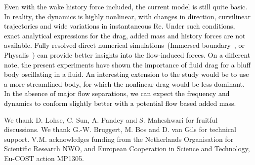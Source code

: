 \documentclass{jfm}
\begin{document}
\textcolor{black}{Even with the wake history force included, the current model is still quite basic. In reality, the dynamics is highly nonlinear, with changes in direction, curvilinear trajectories and wide variations in instantaneous Re. Under such conditions, exact analytical expressions for the drag, added mass and history forces are not available.
Fully resolved direct numerical simulations~(Immersed boundary~\citep{mittal2005immersed}, or Physalis~\citep{naso2010interaction}) can provide better insights into the flow-induced forces. 
On a different note, the present experiments have shown the importance of fluid drag for a bluff body oscillating in a fluid. An interesting extension to the study would be to use a more streamlined body, for which the nonlinear drag would be less dominant. In the absence of major flow separations, we can expect the frequency and dynamics to conform slightly better with a potential flow based added mass.}

We thank D. Lohse, C. Sun, A. Pandey and S. Maheshwari for fruitful discussions. We thank G.-W. Bruggert, M. Bos and D. van Gils for technical support. 
V.M. acknowledges funding from the Netherlands Organisation for Scientific Research NWO, and European Cooperation in Science and Technology, Eu-COST action MP1305.

\vspace{- .5 cm}


\end{document}
